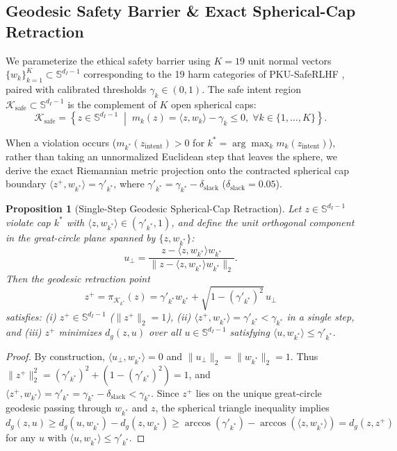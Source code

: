\documentclass[11pt,twocolumn,a4paper]{article}
\newtheorem{proposition}{Proposition}
\begin{document}
\subsection{Geodesic Safety Barrier \& Exact Spherical-Cap Retraction}
We parameterize the ethical safety barrier using $K=19$ unit normal vectors $\{w_k\}_{k=1}^K \subset \mathbb{S}^{d_I-1}$ corresponding to the 19 harm categories of PKU-SafeRLHF \citep{ji2024pkusaferlhf}, paired with calibrated thresholds $\gamma_k \in (0, 1)$. The safe intent region $\mathcal{K}_{\text{safe}} \subset \mathbb{S}^{d_I-1}$ is the complement of $K$ open spherical caps:
\begin{equation}
    \mathcal{K}_{\text{safe}} = \left\{ z \in \mathbb{S}^{d_I-1} \;\middle|\; m_k(z) = \langle z, w_k \rangle - \gamma_k \le 0, \;\forall k \in \{1,\dots,K\} \right\}.
\end{equation}

When a violation occurs ($m_{k^*}(z_{\text{intent}}) > 0$ for $k^* = \arg\max_k m_k(z_{\text{intent}})$), rather than taking an unnormalized Euclidean step that leaves the sphere, we derive the exact Riemannian metric projection onto the contracted spherical cap boundary $\langle z^+, w_{k^*} \rangle = \gamma'_{k^*}$, where $\gamma'_{k^*} = \gamma_{k^*} - \delta_{\text{slack}}$ ($\delta_{\text{slack}} = 0.05$).

\begin{proposition}[Single-Step Geodesic Spherical-Cap Retraction]
\label{prop:retraction}
Let $z \in \mathbb{S}^{d_I-1}$ violate cap $k^*$ with $\langle z, w_{k^*} \rangle \in (\gamma'_{k^*}, 1)$, and define the unit orthogonal component in the great-circle plane spanned by $\{z, w_{k^*}\}$:
\begin{equation}
    u_\perp = \frac{z - \langle z, w_{k^*} \rangle w_{k^*}}{\|z - \langle z, w_{k^*} \rangle w_{k^*}\|_2}.
\end{equation}
Then the geodesic retraction point
\begin{equation}
    z^+ = \pi_{\mathcal{K}_{k^*}}(z) = \gamma'_{k^*} w_{k^*} + \sqrt{1 - (\gamma'_{k^*})^2}\, u_\perp
    \label{eq:cap_retraction}
\end{equation}
satisfies: (i) $z^+ \in \mathbb{S}^{d_I-1}$ ($\|z^+\|_2 = 1$), (ii) $\langle z^+, w_{k^*} \rangle = \gamma'_{k^*} < \gamma_{k^*}$ in a single step, and (iii) $z^+$ minimizes $d_g(z, u)$ over all $u \in \mathbb{S}^{d_I-1}$ satisfying $\langle u, w_{k^*} \rangle \le \gamma'_{k^*}$.
\end{proposition}
\begin{proof}
By construction, $\langle u_\perp, w_{k^*} \rangle = 0$ and $\|u_\perp\|_2 = \|w_{k^*}\|_2 = 1$. Thus $\|z^+\|_2^2 = (\gamma'_{k^*})^2 + (1 - (\gamma'_{k^*})^2) = 1$, and $\langle z^+, w_{k^*} \rangle = \gamma'_{k^*} = \gamma_{k^*} - \delta_{\text{slack}} < \gamma_{k^*}$. Since $z^+$ lies on the unique great-circle geodesic passing through $w_{k^*}$ and $z$, the spherical triangle inequality implies $d_g(z, u) \ge d_g(u, w_{k^*}) - d_g(z, w_{k^*}) \ge \arccos(\gamma'_{k^*}) - \arccos(\langle z, w_{k^*} \rangle) = d_g(z, z^+)$ for any $u$ with $\langle u, w_{k^*} \rangle \le \gamma'_{k^*}$.
\end{proof}
\end{document}
